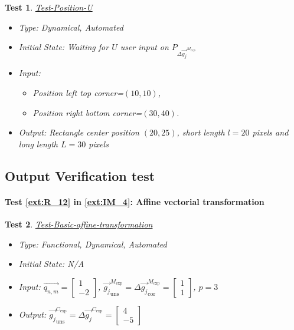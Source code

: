 \documentclass[12pt, titlepage]{article}
\newtheorem{Test}{Test}
\begin{document}
\begin{Test}\normalfont\underline{Test-Position-U}
\label{Test-Position-U}
\begin{itemize}
\item Type: Dynamical, Automated
\item Initial State: Waiting for $U$ user input on $P_{\Delta \overrightarrow{g_{j}}^{M_{exp}}}$
\item Input: 
	\begin{itemize}
	\item Position left top corner=$(10,10)$, 
	\item Position right bottom corner=$(30,40)$.
	\end{itemize}
\item Output: Rectangle center position $(20,25)$, short length $l=20$ pixels and long length $L=30$ pixels
\end{itemize}
\end{Test}


\subsection{Output Verification test}

\paragraph{Test \cref{ext:R_12} in \cref{ext:IM_4}: Affine vectorial transformation}

\begin{Test}\normalfont\underline{Test-Basic-affine-transformation}
\label{Test-Basic-affine-transformation}
\begin{itemize}
\item Type: Functional, Dynamical, Automated
\item Initial State: N/A
\item Input: $\overrightarrow{q_{n,m}}=\begin{bmatrix}
1 \\
-2
\end{bmatrix}$, $\overrightarrow{g_{j}}_{\text{uns}}^{M_{\text{exp}}}=\Delta\overrightarrow{g_{j}}_{\text{cor}}^{M_{\text{exp}}}=\begin{bmatrix}
1 \\
1
\end{bmatrix}$, $p=3$
\item Output:  $\overrightarrow{g_{j}}_{\text{uns}}^{C_{\text{exp}}}=\Delta\overrightarrow{g_{j}}^{C_{\text{exp}}}=\begin{bmatrix}
4\\
-5
\end{bmatrix}$
\end{itemize}
\end{Test}
\end{document}
